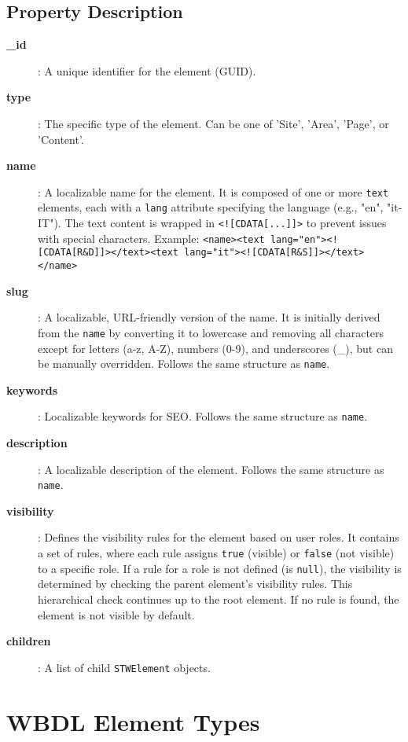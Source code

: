 \subsection{Property Description}

\begin{description}
\item[\textbf{\_id}]: A unique identifier for the element (GUID).
\item[\textbf{type}]: The specific type of the element. Can be one of 'Site', 'Area', 'Page', or 'Content'.
\item[\textbf{name}]: A localizable name for the element. It is composed of one or more \texttt{text} elements, each with a \texttt{lang} attribute specifying the language (e.g., "en", "it-IT"). The text content is wrapped in \texttt{<![CDATA[...]]>} to prevent issues with special characters. Example: \texttt{<name><text lang="en"><![CDATA[R\&D]]></text><text lang="it"><![CDATA[R\&S]]></text></name>}
\item[\textbf{slug}]: A localizable, URL-friendly version of the name. It is initially derived from the \texttt{name} by converting it to lowercase and removing all characters except for letters (a-z, A-Z), numbers (0-9), and underscores (\_), but can be manually overridden. Follows the same structure as \texttt{name}.
\item[\textbf{keywords}]: Localizable keywords for SEO. Follows the same structure as \texttt{name}.
\item[\textbf{description}]: A localizable description of the element. Follows the same structure as \texttt{name}.
\item[\textbf{visibility}]: Defines the visibility rules for the element based on user roles. It contains a set of rules, where each rule assigns \texttt{true} (visible) or \texttt{false} (not visible) to a specific role. If a rule for a role is not defined (is \texttt{null}), the visibility is determined by checking the parent element's visibility rules. This hierarchical check continues up to the root element. If no rule is found, the element is not visible by default.
\item[\textbf{children}]: A list of child \texttt{STWElement} objects.
\end{description}

\section{WBDL Element Types}
\label{sec:wbdl-element-types}

